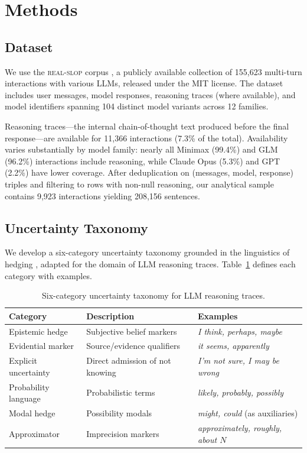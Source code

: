 \section{Methods}

\subsection{Dataset}

We use the \textsc{real-slop} corpus \citep{solenopsisbot2025realslop}, a publicly available collection of 155,623 multi-turn interactions with various LLMs, released under the MIT license. The dataset includes user messages, model responses, reasoning traces (where available), and model identifiers spanning 104 distinct model variants across 12 families.

Reasoning traces---the internal chain-of-thought text produced before the final response---are available for 11,366 interactions (7.3\% of the total). Availability varies substantially by model family: nearly all Minimax (99.4\%) and GLM (96.2\%) interactions include reasoning, while Claude Opus (5.3\%) and GPT (2.2\%) have lower coverage. After deduplication on (messages, model, response) triples and filtering to rows with non-null reasoning, our analytical sample contains 9,923 interactions yielding 208,156 sentences.



\subsection{Uncertainty Taxonomy}

We develop a six-category uncertainty taxonomy grounded in the linguistics of hedging \citep{hyland1998hedging, holmes1988doubt}, adapted for the domain of LLM reasoning traces. Table~\ref{tab:taxonomy} defines each category with examples.

\begin{table}[t]
\centering
\caption{Six-category uncertainty taxonomy for LLM reasoning traces.}
\label{tab:taxonomy}
\small
\begin{tabular}{lll}
\toprule
Category & Description & Examples \\
\midrule
Epistemic hedge & Subjective belief markers & \emph{I think, perhaps, maybe} \\
Evidential marker & Source/evidence qualifiers & \emph{it seems, apparently} \\
Explicit uncertainty & Direct admission of not knowing & \emph{I'm not sure, I may be wrong} \\
Probability language & Probabilistic terms & \emph{likely, probably, possibly} \\
Modal hedge & Possibility modals & \emph{might, could} (as auxiliaries) \\
Approximator & Imprecision markers & \emph{approximately, roughly, about $N$} \\
\bottomrule
\end{tabular}
\end{table}

